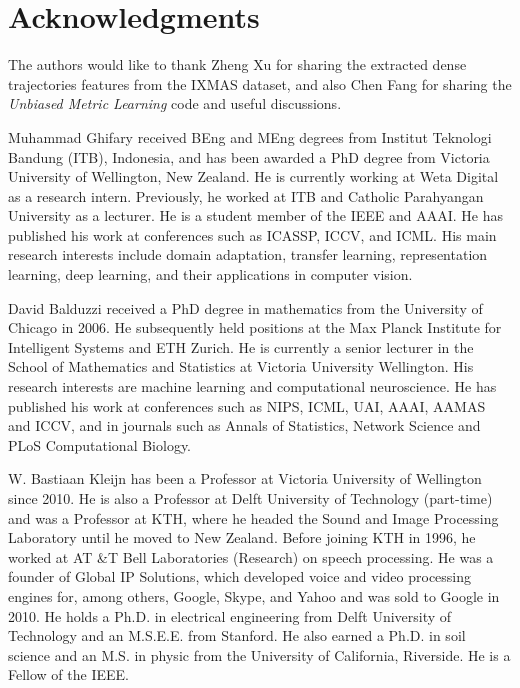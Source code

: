 \documentclass[10pt,journal,compsoc]{IEEEtran}
\begin{document}
\vspace{-1em}
\section{Acknowledgments} 
The authors would like to thank Zheng Xu for sharing the extracted dense trajectories features from the IXMAS dataset, and also Chen Fang for sharing the \emph{Unbiased Metric Learning} code and useful discussions.
\vspace{-1em}



{
\footnotesize

}


\begin{IEEEbiography}{Muhammad Ghifary} 
received BEng and MEng degrees from Institut Teknologi Bandung (ITB), Indonesia, 
and has been awarded a PhD degree from Victoria University of Wellington, New Zealand.
He is currently working at Weta Digital as a research intern.
Previously, he worked at ITB and Catholic Parahyangan University as a lecturer.
He is a student member of the IEEE and AAAI. 
He has published his work at conferences such as ICASSP, ICCV, and ICML.
His main research interests include domain adaptation, transfer learning, representation learning, deep learning, and their applications in computer vision.
\end{IEEEbiography}
\vspace{-3em}
\begin{IEEEbiography}{David Balduzzi}
received a PhD degree in mathematics from the University of Chicago in 2006. He subsequently held positions at the Max Planck Institute for Intelligent Systems and ETH Zurich. He is currently a senior lecturer in the School of Mathematics and Statistics at Victoria University Wellington. His research interests are machine learning and computational neuroscience. He has published his work at conferences such as NIPS, ICML, UAI, AAAI, AAMAS and ICCV, and in journals such as Annals of Statistics, Network Science and PLoS Computational Biology.
\end{IEEEbiography}
\vspace{-3em}
\begin{IEEEbiography}{W. Bastiaan Kleijn}
has been a Professor at Victoria University of Wellington since 2010. 
He is also a Professor at Delft University of Technology (part-time) and was a Professor at KTH, where he headed the Sound and Image Processing Laboratory until he moved to New Zealand. Before joining KTH in 1996, he worked at AT \&T Bell Laboratories (Research) on speech processing. 
He was a founder of Global IP Solutions, which developed voice and video processing engines for, among others, Google, Skype, and Yahoo and was sold to Google in 2010. 
He holds a Ph.D. in electrical engineering from Delft University of Technology and an M.S.E.E. from Stanford. 
He also earned a Ph.D. in soil science and an M.S. in physic from the University of California, Riverside. 
He is a Fellow of the IEEE.
\end{IEEEbiography}
\end{document}
